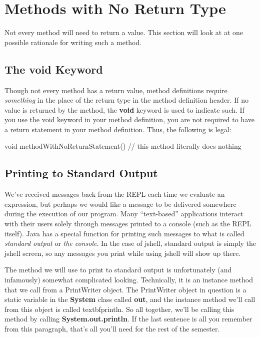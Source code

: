 \section{Methods with No Return Type}

Not every method will need to return a value. This section will look at at one possible rationale for writing such a method.

\subsection{The void Keyword}

Though not every method has a return value, method definitions require \textit{something} in the place of the return type in the method definition header. If no value is returned by the method, the \textbf{void} keyword is used to indicate such. If you use the void keyword in your method definition, you are not required to have a return statement in your method definition. Thus, the following is legal:

\begin{code}
void methodWithNoReturnStatement() {
  // this method literally does nothing
}
\end{code}

\subsection{Printing to Standard Output}

We've received messages back from the REPL each time we evaluate an expression, but perhaps we would like a message to be delivered somewhere during the execution of our program. Many ``text-based'' applications interact with their users solely through messages printed to a console (such as the REPL itself). Java has a special function for printing such messages to what is called \textit{standard output} or \textit{the console}. In the case of jshell, standard output is simply the jshell screen, so any messages you print while using jshell will show up there.

The method we will use to print to standard output is unfortunately (and infamously) somewhat complicated looking. Technically, it is an instance method that we call from a PrintWriter object. The PrintWriter object in question is a static variable in the \textbf{System} class called \textbf{out}, and the instance method we'll call from this object is called textbf{println}. So all together, we'll be calling this method by calling \textbf{System.out.println}. If the last sentence is all you remember from this paragraph, that's all you'll need for the rest of the semester. 

